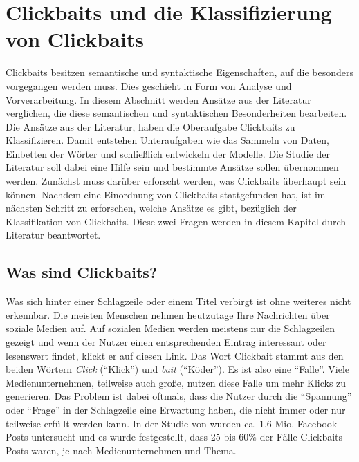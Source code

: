 
\chapter{Clickbaits und die Klassifizierung von Clickbaits}\label{ch4}


Clickbaits besitzen semantische und syntaktische Eigenschaften, auf die besonders vorgegangen werden muss. Dies geschieht in Form von Analyse und Vorverarbeitung. In diesem Abschnitt werden Ansätze aus der Literatur verglichen, die diese semantischen und syntaktischen Besonderheiten bearbeiten. Die Ansätze aus der Literatur, haben die Oberaufgabe Clickbaits zu Klassifizieren. Damit entstehen Unteraufgaben wie das Sammeln von Daten, Einbetten der Wörter und schließlich entwickeln der Modelle. Die Studie der Literatur soll dabei eine Hilfe sein und bestimmte Ansätze sollen übernommen werden. Zunächst muss darüber erforscht werden, was Clickbaits überhaupt sein können. Nachdem eine Einordnung von Clickbaits stattgefunden hat, ist im nächsten Schritt zu erforschen, welche Ansätze es gibt, bezüglich der Klassifikation von Clickbaits. Diese zwei Fragen werden in diesem Kapitel durch Literatur beantwortet.

\section{Was sind Clickbaits?}

Was sich hinter einer Schlagzeile oder einem Titel verbirgt ist ohne weiteres nicht erkennbar. Die meisten Menschen nehmen heutzutage Ihre Nachrichten über soziale Medien auf. Auf sozialen Medien werden meistens nur die Schlagzeilen gezeigt und wenn der Nutzer einen entsprechenden Eintrag interessant oder lesenswert findet, klickt er auf diesen Link. Das Wort Clickbait stammt aus den beiden Wörtern \textit{Click} (\enquote{Klick}) und \textit{bait} (\enquote{Köder}). Es ist also eine \enquote{Falle}. Viele Medienunternehmen, teilweise auch große, nutzen diese Falle um mehr Klicks zu generieren. Das Problem ist dabei oftmals, dass die Nutzer durch die \enquote{Spannung} oder \enquote{Frage} in der Schlagzeile eine Erwartung haben, die nicht immer oder nur teilweise erfüllt werden kann. In der Studie von \cite*{Main} wurden ca. 1,6 Mio. Facebook-Posts untersucht und es wurde festgestellt, dass 25 bis 60\% der Fälle Clickbaits-Posts waren, je nach Medienunternehmen und Thema.

